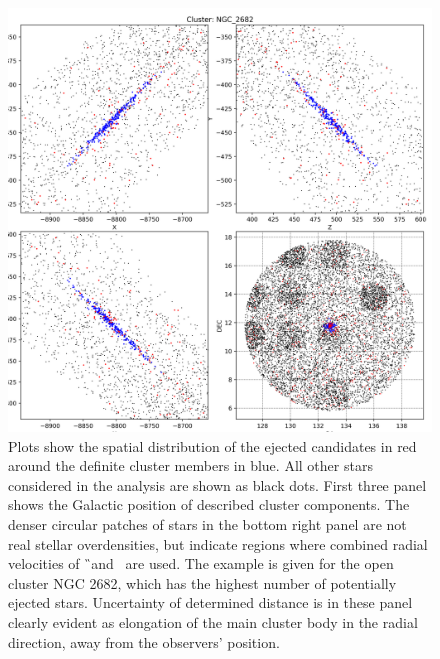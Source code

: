 \begin{figure}
	\centering
	\includegraphics[width=\textwidth]{NGC_2682_possible_ejected-step1.png}
	\caption{ Plots show the spatial distribution of the ejected candidates in red around the definite cluster members in blue. All other stars considered in the analysis are shown as black dots. First three panel shows the Galactic position of described cluster components. The denser circular patches of stars in the bottom right panel are not real stellar overdensities, but indicate regions where combined radial velocities of \G\ and \Gh\ are used. The example is given for the open cluster NGC 2682, which has the highest number of potentially ejected stars. Uncertainty of determined distance is in these panel clearly evident as elongation of the main cluster body in the radial direction, away from the observers' position.}
	\label{fig:ejected_around_cluster}
\end{figure}

